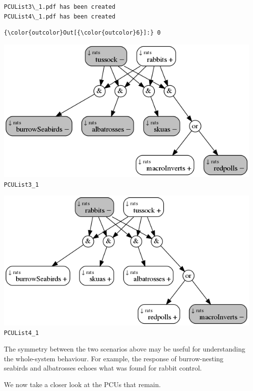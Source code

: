 \documentclass[11pt]{article}
\makeatletter
\def\maxwidth{\ifdim\Gin@nat@width>\linewidth\linewidth
    \else\Gin@nat@width\fi}
\let\Oldincludegraphics\includegraphics
\renewcommand{\includegraphics}[1]{\Oldincludegraphics[width=.8\maxwidth]{#1}}
\makeatother
\begin{document}
    \begin{Verbatim}[commandchars=\\\{\}]
PCUList3\_1.pdf has been created
PCUList4\_1.pdf has been created

    \end{Verbatim}

\begin{Verbatim}[commandchars=\\\{\}]
{\color{outcolor}Out[{\color{outcolor}6}]:} 0
\end{Verbatim}
            
    \includegraphics{PCUList3_1.png} \texttt{PCUList3\_1}

\includegraphics{PCUList4_1.png} \texttt{PCUList4\_1}

    The symmetry between the two scenarios above may be useful for
understanding the whole-system behaviour. For example, the response of
burrow-nesting seabirds and albatrosses echoes what was found for rabbit
control.

We now take a closer look at the PCUs that remain.
\end{document}
